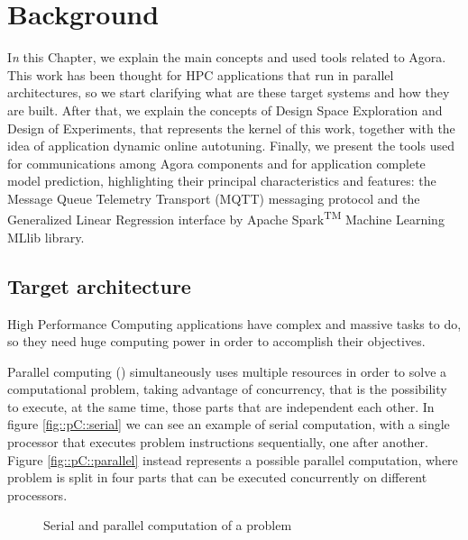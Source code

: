 \chapter{Background}\label{back}

\lettrine{I}{}\textit{n} this Chapter, we explain the main concepts and used tools related to Agora. This work has been thought for HPC applications that run in parallel architectures, so we start clarifying what are these target systems and how they are built. After that, we explain the concepts of Design Space Exploration and Design of Experiments, that represents the kernel of this work, together with the idea of application dynamic online autotuning. Finally, we present the tools used for communications among Agora components and for application complete model prediction, highlighting their principal characteristics and features: the Message Queue Telemetry Transport (MQTT) messaging protocol and the Generalized Linear Regression interface by Apache Spark\textsuperscript{TM} Machine Learning MLlib library.

\section{Target architecture}

High Performance Computing applications have complex and massive tasks to do, so they need huge computing power in order to accomplish their objectives.

Parallel computing (\cite{barney2012introduction}) simultaneously uses multiple re\-sourc\-es in order to solve a computational problem, taking advantage of concurrency, that is the possibility to execute, at the same time, those parts that are independent each other. In figure \ref{fig::pC::serial} we can see an example of serial computation, with a single processor that executes problem instructions sequentially, one after another. Figure \ref{fig::pC::parallel} instead represents a possible parallel computation, where problem is split in four parts that can be executed concurrently on different processors.

\begin{figure}[htb]

    \centering

    \enskip
    
    \caption{Serial and parallel computation of a problem}

\end{figure}

